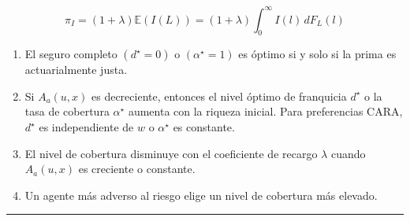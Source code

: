 \begin{f}
	\[
	\pi_I=(1+\lambda) \mathbb{E}(I(L))=(1+\lambda) \int_{0}^{\infty} I(l)\, d F_{L}(l)
	\]
	
	\begin{enumerate}
		\item El seguro completo \((d^\star = 0)\) o \((\alpha^\star = 1)\) es óptimo si y solo si la prima es actuarialmente justa.
		
		\item Si \(A_a(u, x)\) es decreciente, entonces el nivel óptimo de franquicia \(d^\star\) o la tasa de cobertura \(\alpha^\star\) aumenta con la riqueza inicial.
		Para preferencias CARA, \(d^\star\) es independiente de \(w\) o \(\alpha^\star\) es constante.
		
		\item El nivel de cobertura disminuye con el coeficiente de recargo \(\lambda\) cuando \(A_a(u, x)\) es creciente o constante.
		
		\item Un agente más adverso al riesgo elige un nivel de cobertura más elevado.
	\end{enumerate}
\end{f}
\hrule

